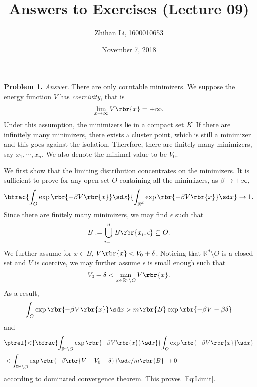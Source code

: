 \documentclass[english, nochinese]{pnote}
\title{Answers to Exercises (Lecture 09)}
\author{Zhihan Li, 1600010653}
\date{November 7, 2018}
\begin{document}
\maketitle

\textbf{Problem 1.} \textit{Answer.} There are only countable minimizers. We suppose the energy function $V$ has \emph{coercivity}, that is
\begin{equation}
\lim_{ x \rightarrow \infty } V \rbr{x} = +\infty.
\end{equation}
Under this assumption, the minimizers lie in a compact set $K$. If there are infinitely many minimizers, there exists a cluster point, which is still a minimizer and this goes against the isolation. Therefore, there are finitely many minimizers, say $ x_1, \cdots, x_n $. We also denote the minimal value to be $V_0$.

We first show that the limiting distribution concentrates on the minimizers. It is sufficient to prove for any open set $O$ containing all the minimizers, as $ \beta \rightarrow +\infty $,
\begin{equation} \label{Eq:Limit}
\bfrac{ \int_O \exp \rbr{ -\beta V \rbr{x} } \sd x }{ \int_{\mathbb{R}^d} \exp \rbr{ -\beta V \rbr{x} } \sd x } \rightarrow 1.
\end{equation}
Since there are finitely many minimizers, we may find $\epsilon$ such that
\begin{equation}
B := \bigcup_{ i = 1 }^n B \rbr{ x_i, \epsilon } \subseteq O.
\end{equation}
We further assume for $ x \in B $, $ V \rbr{x} < V_0 + \delta $. Noticing that $ \mathbb{R}^d \setminus O $ is a closed set and $V$ is coercive, we may further assume $\epsilon$ is small enough such that
\begin{equation}
V_0 + \delta < \min_{ x \in \mathbb{R}^d \setminus O } V \rbr{x}.
\end{equation}
As a result,
\begin{equation}
\int_O \exp \rbr{ -\beta V \rbr{x} } \sd x > m \rbr{B} \exp \rbr{ -\beta V - \beta \delta }
\end{equation}
and
\begin{equation}
\begin{split}
&\ptrel{<} \bfrac{ \int_{ \mathbb{R}^d \setminus O } \exp \rbr{ -\beta V \rbr{x} } \sd x }{ \int_O \exp \rbr{ -\beta V \rbr{x} } \sd x } \\
&< \int_{ \mathbb{R}^d \setminus O } \exp \rbr{ -\beta \rbr{ V - V_0 - \delta } } \sd x / m \rbr{B} \rightarrow 0
\end{split}
\end{equation}
according to dominated convergence theorem. This proves \eqref{Eq:Limit}.
\end{document}
